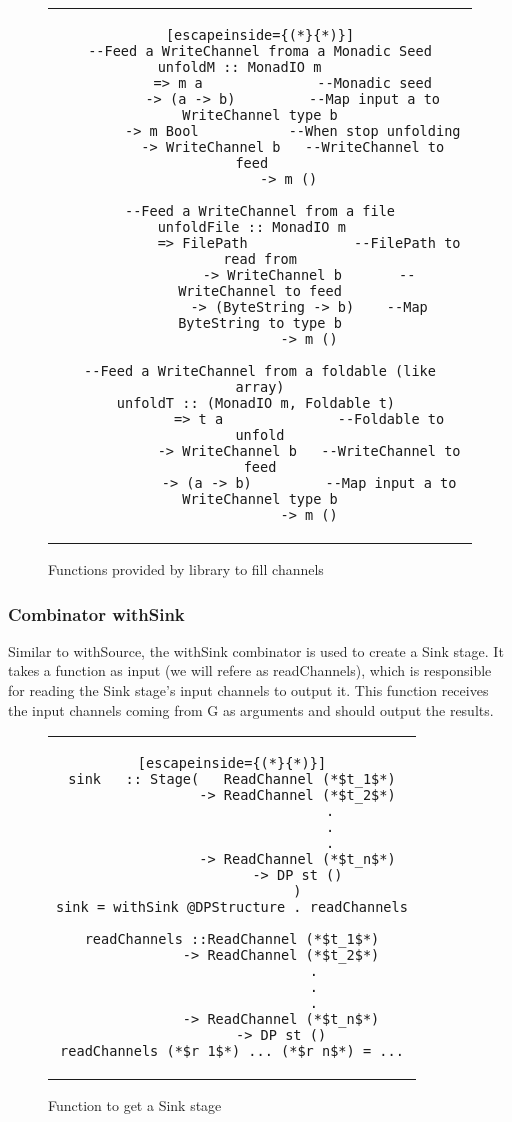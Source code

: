 \begin{figure}[H]
    \begin{tabular}{c}
        \begin{lstlisting}[escapeinside={(*}{*)}]
--Feed a WriteChannel froma a Monadic Seed
unfoldM :: MonadIO m	 
        => m a	            --Monadic seed
        -> (a -> b)	        --Map input a to WriteChannel type b
        -> m Bool	        --When stop unfolding
        -> WriteChannel b   --WriteChannel to feed	
        -> m () 

--Feed a WriteChannel from a file
unfoldFile :: MonadIO m	 
            => FilePath	            --FilePath to read from
            -> WriteChannel b       --WriteChannel to feed
            -> (ByteString -> b)    --Map ByteString to type b
            -> m ()

--Feed a WriteChannel from a foldable (like array)
unfoldT :: (MonadIO m, Foldable t) 
            => t a              --Foldable to unfold
            -> WriteChannel b   --WriteChannel to feed
            -> (a -> b)         --Map input a to WriteChannel type b
            -> m ()
        \end{lstlisting}
    \end{tabular}
    \caption{Functions provided by library to fill channels}
    \label{fig:HC4}
\end{figure}

\subsubsection*{Combinator withSink}
Similar to withSource, the withSink combinator is used to create a Sink stage.
It takes a function as input (we will refere as readChannels), which is responsible for reading the Sink stage's input channels to output it.
This function receives the input channels coming from G as arguments and should output the results.

\begin{figure}[H]
    \begin{tabular}{c}
        \begin{lstlisting}[escapeinside={(*}{*)}]
sink   :: Stage(   ReadChannel (*$t_1$*)
                -> ReadChannel (*$t_2$*)
                        .
                        .
                        .
                -> ReadChannel (*$t_n$*)
                -> DP st ()
                )
sink = withSink @DPStructure . readChannels

readChannels ::ReadChannel (*$t_1$*)
            -> ReadChannel (*$t_2$*)
                    .
                    .
                    .
            -> ReadChannel (*$t_n$*)
            -> DP st ()
readChannels (*$r_1$*) ... (*$r_n$*) = ...
        \end{lstlisting}
    \end{tabular}
    \caption{Function to get a Sink stage}
    \label{fig:HC5}
\end{figure}


